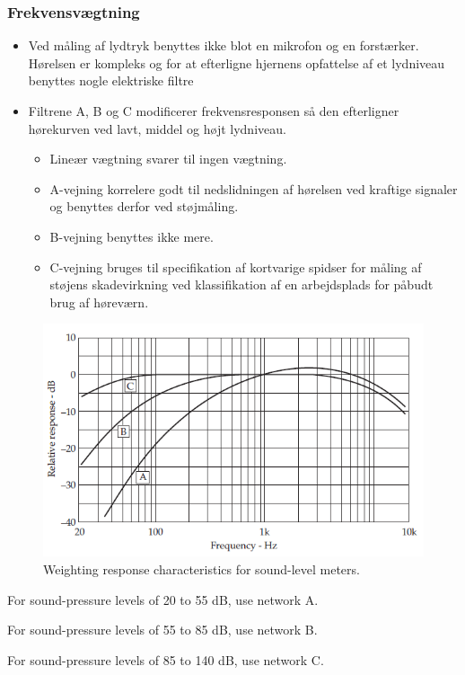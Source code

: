 \subsubsection{Frekvensvægtning}
\begin{itemize}
	\item Ved måling af lydtryk benyttes ikke blot en mikrofon og en forstærker. Hørelsen er kompleks og for at efterligne hjernens opfattelse af et lydniveau benyttes nogle elektriske filtre
	\item Filtrene A, B og C modificerer frekvensresponsen så den efterligner hørekurven ved lavt, middel og højt lydniveau.
	\begin{itemize}
		\item Lineær vægtning svarer til ingen vægtning.
		\item A-vejning korrelere godt til nedslidningen af hørelsen ved kraftige signaler og benyttes derfor ved støjmåling.
		\item B-vejning benyttes ikke mere.
		\item C-vejning bruges til specifikation af kortvarige spidser for måling af støjens skadevirkning ved klassifikation af en arbejdsplads for påbudt brug af høreværn.
	\end{itemize}
\end{itemize}

\begin{figure} [H]
	\centering
	\includegraphics[width=0.9\linewidth]{graphics/7.png}
	\caption{Weighting response characteristics for sound-level meters.}
	\label{fig:7}
\end{figure}

\begin{description}
	\item For sound-pressure levels of 20 to 55 dB, use network A.
	\item For sound-pressure levels of 55 to 85 dB, use network B.
	\item For sound-pressure levels of 85 to 140 dB, use network C.
\end{description}


